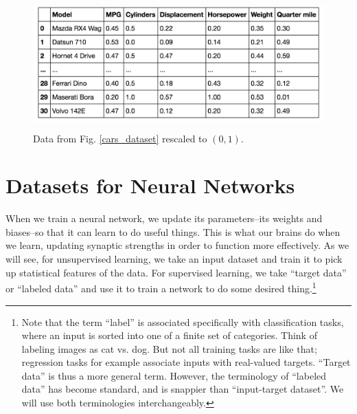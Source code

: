 \begin{figure}[h]
\centering
\includegraphics[height=50mm]{./images/CarsScaled.png}
\caption[Screenshot of Motor Trend Car Road Tests dataset included with R.]{Data from Fig. \ref{cars_dataset} rescaled to $(0,1)$.}
\label{cars_dataset_scaled}
\end{figure}

\section{Datasets for Neural Networks}

When we train a neural network, we update its parameters--its weights and biases--so that it can learn to do useful things. This is what our brains do when we learn, updating synaptic strengths in order to function more effectively. As we will see, for unsupervised learning, we take an input dataset and train it to pick up statistical features of the data. For supervised learning, we take ``target data'' or ``labeled data'' and use it to train a network to do some desired thing.\footnote{Note that the term ``label'' is associated specifically with classification tasks, where an input is sorted into one of a finite set of categories. Think of labeling images as cat vs. dog. But not all training tasks are like that; regression tasks for example associate inputs with real-valued targets. ``Target data''  is thus a more general term. However, the terminology of ``labeled data''  has become standard, and  is snappier than ``input-target dataset''. We will use both terminologies interchangeably.}

